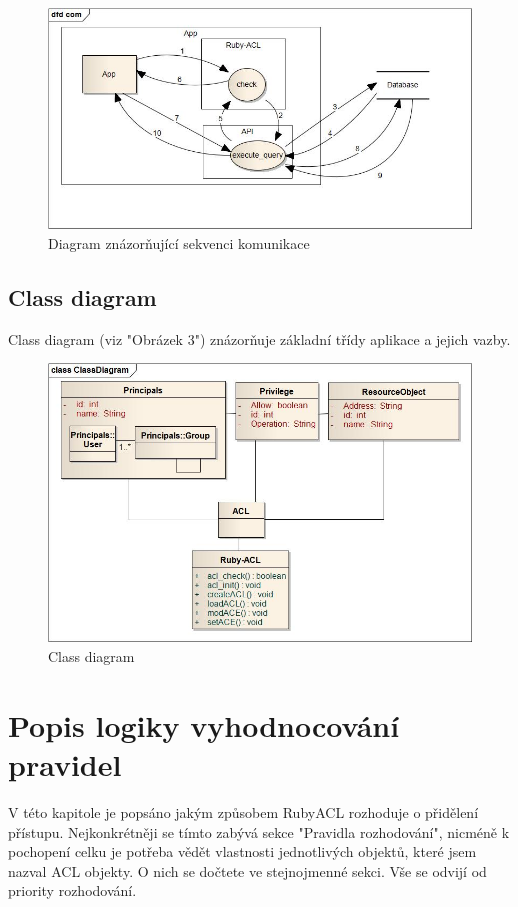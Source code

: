 \begin{figure}
\includegraphics[width=15cm]{com.jpg}
\caption{Diagram znázorňující sekvenci komunikace}
\label{fig:Communication diagram}
\end{figure}


\subsection{Class diagram}
Class diagram (viz "Obrázek 3") znázorňuje základní třídy aplikace a jejich vazby.
\begin{figure}
\includegraphics[width=15cm]{ClassDiagram2.jpg}
\caption{Class diagram}
\label{fig:Class diagram}
\end{figure}

\section{Popis logiky vyhodnocování pravidel}
V této kapitole je popsáno jakým způsobem RubyACL rozhoduje o přidělení přístupu. Nejkonkrétněji se tímto zabývá sekce "Pravidla rozhodování", nicméně k pochopení celku je potřeba vědět vlastnosti jednotlivých objektů, které jsem nazval ACL objekty. O nich se dočtete ve stejnojmenné sekci.
Vše se odvijí od priority rozhodování.

